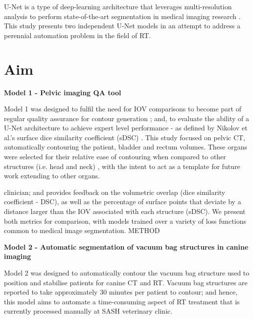 U-Net is a type of deep-learning architecture that leverages multi-resolution
analysis to perform state-of-the-art segmentation in medical imaging research
\cite{Kazemifar_2018, Zhu_2018}. This study presents two independent U-Net
models in an attempt to address a perennial automation problem in the field of
RT.

\section{Aim}


\textbf{Model 1 - Pelvic imaging QA tool}

Model 1 was designed to fulfil the need for IOV comparisons to become part of
regular quality assurance for contour generation \cite{Vinod_2016}; and, to
evaluate the ability of a U-Net architecture to achieve expert level performance
- as defined by Nikolov et al.'s surface dice similarity coefficient (sDSC)
\cite{Nikolov_2018}. This study focused on pelvic CT, automatically
contouring the patient, bladder and rectum volumes. These organs were selected
for their relative ease of contouring when compared to other structures (i.e. head
and neck) \cite{Wong2020}, with the intent to act as a template for future work
extending to other organs.

clinician; and provides feedback on the volumetric overlap (dice similarity
coefficient - DSC), as well as the percentage of surface points that deviate by
a distance larger than the IOV associated with each structure (sDSC). We present
both metrics for comparison, with models trained over a variety of loss
functions common to medical image segmentation. METHOD

\textbf{Model 2 - Automatic segmentation of vacuum bag structures in canine
imaging}

Model 2 was designed to automatically contour the vacuum bag structure used to
position and stabilise patients for canine CT and RT. Vacuum bag structures are
reported to take approximately 30 minutes per patient to contour; and hence,
this model aims to automate a time-consuming aspect of RT treatment that is
currently processed manually at SASH veterinary clinic.


